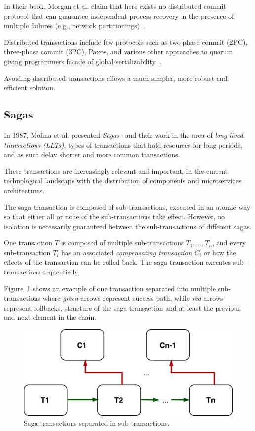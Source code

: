 In their book, Morgan et al. claim that here exists no distributed commit protocol that can guarantee independent process recovery in the presence of multiple failures (e.g., network partitionings)~\cite{WeikumV2002}.

Distributed transactions include few protocols such as two-phase commit (2PC), three-phase commit (3PC), Paxos, and various other approaches to quorum giving programmers facade of global serializability~\cite{Helland07}. 

Avoiding distributed transactions allows a much simpler, more robust and efficient solution.
%
%
\subsection{Sagas}\label{sec:sagas}
%
In 1987, Molina et al. presented \emph{Sagas}~\cite{Garcia-MolinaS87} and their work in the area of \emph{long-lived transactions (LLTs)}, types of transactions that hold resources for long periods, and as such delay shorter and more common transactions. 

These transactions are increasingly relevant and important, in the current technological landscape with the distribution of components and microservices architectures.

The saga transaction is composed of sub-transactions, executed in an atomic way so that either all or none of the sub-transactions take effect. However, no isolation is necessarily guaranteed between the sub-transactions of different sagas.

One transaction $T$ is composed of multiple sub-transactions $T_1,\ldots,T_n$, and every sub-transaction $T_i$ has an associated \emph{compensating transaction} $C_i$ or how the effects of the transaction can be rolled back. The saga transaction executes sub-transactions sequentially.

Figure~\ref{fig:fig20} shows an example of one transaction separated into multiple sub-transactions where \emph{green} arrows represent success path, while \emph{red} arrows represent rollbacks, structure of the saga transaction and at least the previous and next element in the chain.

\begin{figure}[H]
	\begin{center}
		\includegraphics[scale=0.8]{images/Figure20}
	\end{center}
	\vspace{-0.6cm}
	\caption{Saga transactions separated in sub-transactions.}
	\label{fig:fig20}
\end{figure}

